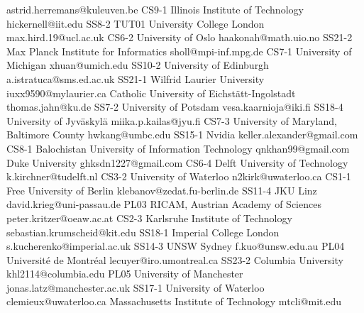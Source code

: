 \begin{multicols}{2}
{ astrid.herremans@kuleuven.be }
{CS9-1}
{}
{ Illinois Institute of Technology }
{ hickernell@iit.edu }
{SS8-2}
{TUT01}
{ University College London }
{ max.hird.19@ucl.ac.uk }
{CS6-2}
{}
{ University of Oslo }
{ haakonah@math.uio.no }
{SS21-2}
{}
{ Max Planck Institute for Informatics }
{ sholl@mpi-inf.mpg.de }
{CS7-1}
{}
{ University of Michigan }
{ xhuan@umich.edu }
{SS10-2}
{}
{ University of Edinburgh }
{ a.istratuca@sms.ed.ac.uk }
{SS21-1}
{}
{ Wilfrid Laurier University }
{ iuxx9590@mylaurier.ca }
{}
{}
{ Catholic University of Eichstätt-Ingolstadt }
{ thomas.jahn@ku.de }
{SS7-2}
{}
{ University of Potsdam }
{ vesa.kaarnioja@iki.fi }
{SS18-4}
{}
{ University of Jyväskylä }
{ miika.p.kailas@jyu.fi }
{CS7-3}
{}
{ University of Maryland, Baltimore County }
{ hwkang@umbc.edu }
{SS15-1}
{}
{ Nvidia }
{ keller.alexander@gmail.com }
{CS8-1}
{}
{ Balochistan University of Information Technology }
{ qnkhan99@gmail.com }
{}
{}
{ Duke University }
{ ghksdn1227@gmail.com }
{CS6-4}
{}
{ Delft University of Technology }
{ k.kirchner@tudelft.nl }
{CS3-2}
{}
{ University of Waterloo }
{ n2kirk@uwaterloo.ca }
{CS1-1}
{}
{ Free University of Berlin }
{ klebanov@zedat.fu-berlin.de }
{SS11-4}
{}
{ JKU Linz }
{ david.krieg@uni-passau.de }
{PL03}
{}
{ RICAM, Austrian Academy of Sciences }
{ peter.kritzer@oeaw.ac.at }
{CS2-3}
{}
{ Karlsruhe Institute of Technology }
{ sebastian.krumscheid@kit.edu }
{SS18-1}
{}
{ Imperial College London }
{ s.kucherenko@imperial.ac.uk }
{SS14-3}
{}
{ UNSW Sydney }
{ f.kuo@unsw.edu.au }
{PL04}
{}
{ Université de Montréal }
{ lecuyer@iro.umontreal.ca }
{SS23-2}
{}
{ Columbia University }
{ khl2114@columbia.edu }
{PL05}
{}
{ University of Manchester }
{ jonas.latz@manchester.ac.uk }
{SS17-1}
{}
{ University of Waterloo }
{ clemieux@uwaterloo.ca }
{}
{}
{ Massachusetts Institute of Technology }
{ mtcli@mit.edu }

\end{multicols}
